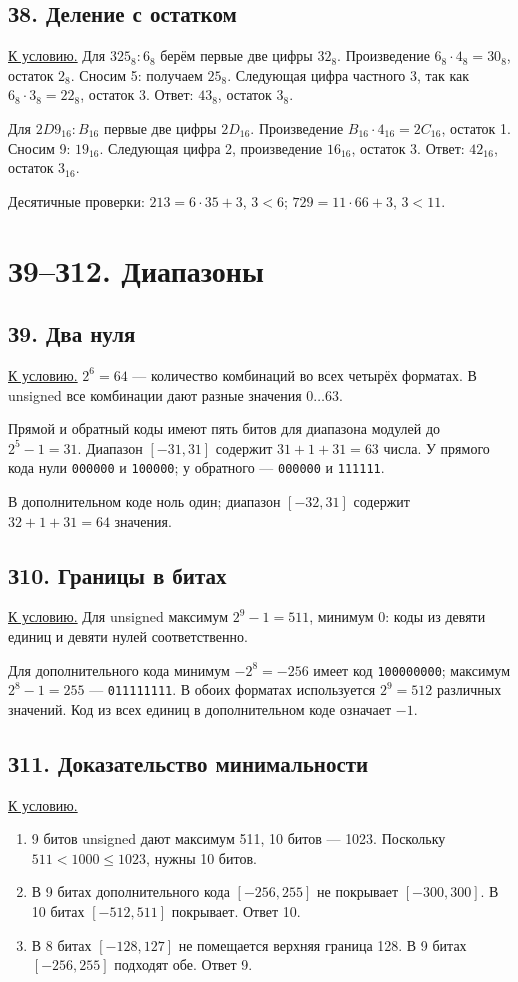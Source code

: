 \subsection*{З8. Деление с остатком}\label{sol:z8}
\hyperref[task:z8]{К условию.}
Для $325_8:6_8$ берём первые две цифры $32_8$. Произведение $6_8\cdot4_8=30_8$, остаток $2_8$. Сносим 5: получаем $25_8$. Следующая цифра частного 3, так как $6_8\cdot3_8=22_8$, остаток 3. Ответ: $43_8$, остаток $3_8$.

Для $2D9_{16}:B_{16}$ первые две цифры $2D_{16}$. Произведение $B_{16}\cdot4_{16}=2C_{16}$, остаток 1. Сносим 9: $19_{16}$. Следующая цифра 2, произведение $16_{16}$, остаток 3. Ответ: $42_{16}$, остаток $3_{16}$.

Десятичные проверки: $213=6\cdot35+3$, $3<6$;
$729=11\cdot66+3$, $3<11$.

\section{З9--З12. Диапазоны}
\subsection*{З9. Два нуля}\label{sol:z9}
\hyperref[task:z9]{К условию.}
$2^6=64$ --- количество комбинаций во всех четырёх форматах. В unsigned все комбинации дают разные значения $0\ldots63$.

Прямой и обратный коды имеют пять битов для диапазона модулей до $2^5-1=31$. Диапазон $[-31,31]$ содержит $31+1+31=63$ числа. У прямого кода нули \texttt{000000} и \texttt{100000}; у обратного --- \texttt{000000} и \texttt{111111}.

В дополнительном коде ноль один; диапазон $[-32,31]$ содержит $32+1+31=64$ значения.

\subsection*{З10. Границы в битах}\label{sol:z10}
\hyperref[task:z10]{К условию.}
Для unsigned максимум $2^9-1=511$, минимум 0: коды из девяти единиц и девяти нулей соответственно.

Для дополнительного кода минимум $-2^8=-256$ имеет код \texttt{100000000}; максимум $2^8-1=255$ --- \texttt{011111111}. В обоих форматах используется $2^9=512$ различных значений. Код из всех единиц в дополнительном коде означает $-1$.

\subsection*{З11. Доказательство минимальности}\label{sol:z11}
\hyperref[task:z11]{К условию.}
\begin{enumerate}
    \item 9 битов unsigned дают максимум 511, 10 битов --- 1023. Поскольку $511<1000\le1023$, нужны 10 битов.
    \item В 9 битах дополнительного кода $[-256,255]$ не покрывает $[-300,300]$. В 10 битах $[-512,511]$ покрывает. Ответ 10.
    \item В 8 битах $[-128,127]$ не помещается верхняя граница 128. В 9 битах $[-256,255]$ подходят обе. Ответ 9.
\end{enumerate}

